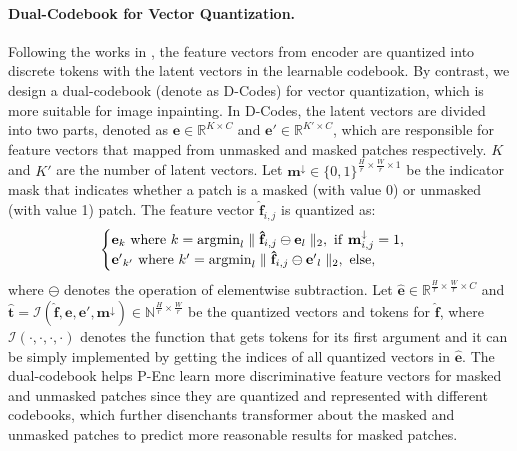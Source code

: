 \documentclass[10pt,twocolumn,letterpaper]{article}
\begin{document}
\paragraph{Dual-Codebook for Vector Quantization.}
\label{sec: d_codes}
Following the works in \cite{van2017neural, razavi2019generating, esser2021taming}, the feature vectors from encoder are quantized into discrete tokens with the latent vectors in the learnable codebook. By contrast, we design a dual-codebook (denote as D-Codes) for vector quantization, which is more suitable for image inpainting. In D-Codes, the latent vectors are divided into two parts, denoted as $\mathbf{e} \in \mathbb{R}^{K\times C}$ and $\mathbf{e'}\in \mathbb{R}^{K'\times C}$, which are responsible for feature vectors that mapped from unmasked and masked patches respectively. $K$ and $K'$ are the number of latent vectors.
Let $\mathbf{m}^{\downarrow} \in \{0,1\}^{\frac{H}{r}\times \frac{W}{r} \times 1}$ be the indicator mask that indicates whether a patch is a masked (with value 0) or unmasked (with value 1) patch.
The feature vector $\mathbf{\hat{f}}_{i,j}$ is quantized as:\begin{equation}
	\begin{cases}
		\mathbf{e}_k \ {\rm where} \ k = {\rm argmin}_{l}\parallel \mathbf{\hat{f}}_{i,j} \ominus \mathbf{e}_l \parallel_2, \ {\rm if} \ \mathbf{m}^{\downarrow}_{i,j} = 1, \\
		\mathbf{e'}_{k'} \ {\rm where} \ k' = {\rm argmin}_{l} \parallel \mathbf{\hat{f}}_{i,j} \ominus \mathbf{e'}_l \parallel_2, \ {\rm else},
	\end{cases}
	\label{eq: vector_quantization}
\end{equation}
where $\ominus$ denotes the operation of elementwise subtraction.  
Let $\mathbf{\hat{e}} \in \mathbb{R}^{\frac{H}{r} \times \frac{W}{r} \times C}$ and $\mathbf{\hat{t}} = \mathcal{I}(\mathbf{\hat{f}}, \mathbf{e}, \mathbf{e'}, \mathbf{m}^{\downarrow}) \in \mathbb{N}^{\frac{H}{r} \times \frac{W}{r}}$ be the quantized vectors and tokens for $\mathbf{\hat{f}}$, where $\mathcal{I}(\cdot, \cdot, \cdot, \cdot)$ denotes the function that gets tokens for its first argument and it can be simply implemented by getting the indices of all quantized vectors in $\mathbf{\hat{e}}$.
The dual-codebook helps P-Enc learn more discriminative feature vectors for masked and unmasked patches since they are quantized and represented with different codebooks, which further disenchants transformer about the masked and unmasked patches to predict more reasonable results for masked patches.
\end{document}
